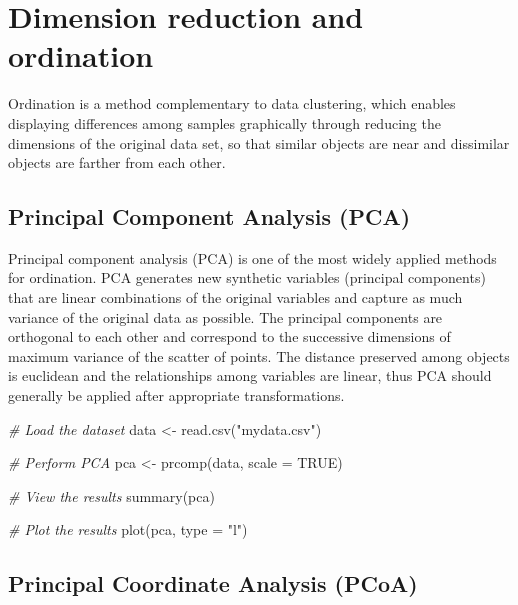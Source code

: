 \documentclass[
]{book}
\newenvironment{Shaded}{\begin{snugshade}}{\end{snugshade}}
\newcommand{\AttributeTok}[1]{\textcolor[rgb]{0.77,0.63,0.00}{#1}}
\newcommand{\CommentTok}[1]{\textcolor[rgb]{0.56,0.35,0.01}{\textit{#1}}}
\newcommand{\ConstantTok}[1]{\textcolor[rgb]{0.00,0.00,0.00}{#1}}
\newcommand{\FunctionTok}[1]{\textcolor[rgb]{0.00,0.00,0.00}{#1}}
\newcommand{\NormalTok}[1]{#1}
\newcommand{\OtherTok}[1]{\textcolor[rgb]{0.56,0.35,0.01}{#1}}
\newcommand{\StringTok}[1]{\textcolor[rgb]{0.31,0.60,0.02}{#1}}
\begin{document}
\normalsize

\hypertarget{dimension-reduction-ordination}{%
\section{Dimension reduction and ordination}\label{dimension-reduction-ordination}}

Ordination is a method complementary to data clustering, which enables displaying differences among samples graphically through reducing the dimensions of the original data set, so that similar objects are near and dissimilar objects are farther from each other.

\hypertarget{pca}{%
\subsection{Principal Component Analysis (PCA)}\label{pca}}

Principal component analysis (PCA) is one of the most widely applied methods for ordination. PCA generates new synthetic variables (principal components) that are linear combinations of the original variables and capture as much variance of the original data as possible. The principal components are orthogonal to each other and correspond to the successive dimensions of maximum variance of the scatter of points. The distance preserved among objects is euclidean and the relationships among variables are linear, thus PCA should generally be applied after appropriate transformations.

\small

\begin{Shaded}
\begin{Highlighting}[]
\CommentTok{\# Load the dataset}
\NormalTok{data }\OtherTok{\textless{}{-}} \FunctionTok{read.csv}\NormalTok{(}\StringTok{"mydata.csv"}\NormalTok{)}

\CommentTok{\# Perform PCA}
\NormalTok{pca }\OtherTok{\textless{}{-}} \FunctionTok{prcomp}\NormalTok{(data, }\AttributeTok{scale =} \ConstantTok{TRUE}\NormalTok{)}

\CommentTok{\# View the results}
\FunctionTok{summary}\NormalTok{(pca)}

\CommentTok{\# Plot the results}
\FunctionTok{plot}\NormalTok{(pca, }\AttributeTok{type =} \StringTok{"l"}\NormalTok{)}
\end{Highlighting}
\end{Shaded}

\normalsize

\hypertarget{pcoa}{%
\subsection{Principal Coordinate Analysis (PCoA)}\label{pcoa}}
\end{document}
